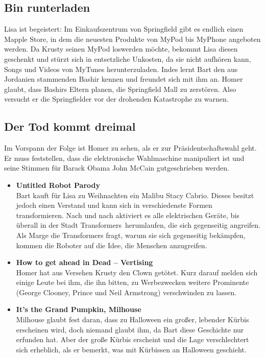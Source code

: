 \subsection{Bin runterladen}\label{KABF20}
Lisa ist begeistert: Im Einkaufszentrum von Springfield gibt es endlich einen Mapple Store, in dem die neuesten Produkte von MyPod bis MyPhone angeboten werden. Da Krusty seinen MyPod loswerden möchte, bekommt Lisa diesen geschenkt und stürzt sich in entsetzliche Unkosten, da sie nicht aufhören kann, Songs und Videos von MyTunes herunterzuladen. Indes lernt Bart den aus Jordanien stammenden Bashir kennen und freundet sich mit ihm an. Homer glaubt, dass Bashirs Eltern planen, die Springfield Mall zu zerstören. Also versucht er die Springfielder vor der drohenden Katastrophe zu warnen. 


\subsection{Der Tod kommt dreimal}\label{KABF16}
Im Vorspann der Folge ist Homer zu sehen, als er zur Präsidentschaftswahl geht. Er muss feststellen, dass die elektronische Wahlmaschine manipuliert ist und seine Stimmen für Barack Obama John McCain gutgeschrieben werden.
\begin{itemize}
	\item \textbf{Untitled Robot Parody}\\ Bart kauft für Lisa zu Weihnachten ein Malibu Stacy Cabrio. Dieses besitzt jedoch einen Verstand und kann sich in verschiedenste Formen transformieren. Nach und nach aktiviert es alle elektrischen Geräte, bis überall in der Stadt \glqq Transformers\grqq\ herumlaufen, die sich gegenseitig angreifen. Als Marge die Transformers fragt, warum sie sich gegenseitig bekämpfen, kommen die Roboter auf die Idee, die Menschen anzugreifen.
	\item \textbf{How to get ahead in Dead -- Vertising}\\ Homer hat aus Versehen Krusty den Clown getötet. Kurz darauf melden sich einige Leute bei ihm, die ihn bitten, zu Werbezwecken weitere Prominente (George Clooney, Prince und Neil Armstrong) verschwinden zu lassen.
	\item \textbf{It's the Grand Pumpkin, Milhouse}\\ Milhouse glaubt fest daran, dass zu Halloween ein großer, lebender Kürbis erscheinen wird, doch niemand glaubt ihm, da Bart diese Geschichte nur erfunden hat. Aber der große Kürbis erscheint und die Lage verschlechtert sich erheblich, als er bemerkt, was mit Kürbissen an Halloween geschieht. 
\end{itemize}
    
